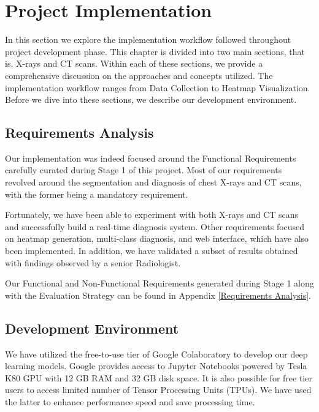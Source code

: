 \chapter{Project Implementation} \label{Project Implementation}

In this section we explore the implementation workflow followed throughout project development phase. This chapter is divided into two main sections, that is, X-rays and CT scans. Within each of these sections, we provide a comprehensive discussion on the approaches and concepts utilized. The implementation workflow ranges from Data Collection to Heatmap Visualization. Before we dive into these sections, we describe our development environment. 

\section{Requirements Analysis}

Our implementation was indeed focused around the Functional Requirements carefully curated during Stage 1 of this project. Most of our requirements revolved around the segmentation and diagnosis of chest X-rays and CT scans, with the former being a mandatory requirement. 

Fortunately, we have been able to experiment with both X-rays and CT scans and successfully build a real-time diagnosis system. Other requirements focused on heatmap generation, multi-class diagnosis, and web interface, which have also been implemented. In addition, we have validated a subset of results obtained with findings observed by a senior Radiologist. 

Our Functional and Non-Functional Requirements generated during Stage 1 along with the Evaluation Strategy can be found in Appendix \ref{Requirements Analysis}.


\section{Development Environment} \label{devEnv}
We have utilized the free-to-use tier of Google Colaboratory to develop our deep learning models. Google provides access to Jupyter Notebooks powered by Tesla K80 GPU with 12 GB RAM and 32 GB disk space. It is also possible for free tier users to access limited number of Tensor Processing Units (TPUs). We have used the latter to enhance performance speed and save processing time.

